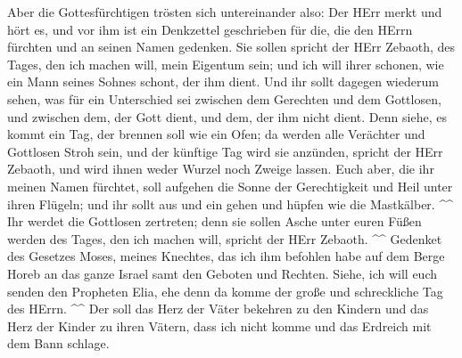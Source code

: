  Aber die Gottesfürchtigen trösten sich untereinander also:
Der HErr merkt und hört es, und vor ihm ist ein Denkzettel geschrieben
für die, die den HErrn fürchten und an seinen Namen gedenken.
 Sie sollen spricht der HErr Zebaoth, des Tages, den ich
machen will, mein Eigentum sein; und ich will ihrer schonen, wie ein
Mann seines Sohnes schont, der ihm dient.  Und ihr sollt
dagegen wiederum sehen, was für ein Unterschied sei zwischen dem
Gerechten und dem Gottlosen, und zwischen dem, der Gott dient, und dem,
der ihm nicht dient.  Denn siehe, es kommt ein Tag, der
brennen soll wie ein Ofen; da werden alle Verächter und Gottlosen Stroh
sein, und der künftige Tag wird sie anzünden, spricht der HErr Zebaoth,
und wird ihnen weder Wurzel noch Zweige lassen.  Euch aber,
die ihr meinen Namen fürchtet, soll aufgehen die Sonne der Gerechtigkeit
und Heil unter ihren Flügeln; und ihr sollt aus und ein gehen und hüpfen
wie die Mastkälber. \^{}\^{}  Ihr werdet die Gottlosen
zertreten; denn sie sollen Asche unter euren Füßen werden des Tages, den
ich machen will, spricht der HErr Zebaoth. \^{}\^{} 
Gedenket des Gesetzes Moses, meines Knechtes, das ich ihm befohlen habe
auf dem Berge Horeb an das ganze Israel samt den Geboten und Rechten.
 Siehe, ich will euch senden den Propheten Elia, ehe denn
da komme der große und schreckliche Tag des HErrn. \^{}\^{}
 Der soll das Herz der Väter bekehren zu den Kindern und
das Herz der Kinder zu ihren Vätern, dass ich nicht komme und das
Erdreich mit dem Bann schlage.
